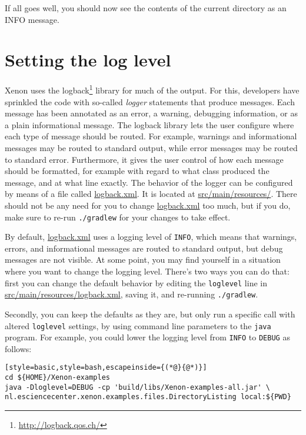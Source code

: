 If all goes well, you should now see the contents of the current directory as an INFO message.


\section{Setting the log level}
\label{sec:setting-the-log-level-command-line}

Xenon uses the logback\footnote{\url{http://logback.qos.ch/}} library for much of the output. For this, developers have sprinkled the code with so-called \textit{logger} statements that produce messages. Each message has been annotated as an error, a warning, debugging information, or as a plain informational message. The logback library lets the user configure where each type of message should be routed. For example, warnings and informational messages may be routed to standard output, while error messages may be routed to standard error. Furthermore, it gives the user control of how each message should be formatted, for example with regard to what class produced the message, and at what line exactly. The behavior of the logger can be configured by means of a file called \url{logback.xml}. It is located at \url{src/main/resources/}. There should not be any need for you to change \url{logback.xml} too much, but if you do, make sure to re-run \texttt{./gradlew} for your changes to take effect.

By default, \url{logback.xml} uses a logging level of \texttt{INFO}, which means that warnings, errors, and informational messages are routed to standard output, but debug messages are not visible. At some point, you may find yourself in a situation where you want to change the logging level. There's two ways you can do that: first you can change the default behavior by editing the \texttt{loglevel} line in \url{src/main/resources/logback.xml}, saving it, and re-running \texttt{./gradlew}.

Secondly, you can keep the defaults as they are, but only run a specific call with altered \texttt{loglevel} settings, by using command line parameters to the \texttt{java} program. For example, you could lower the logging level from \texttt{INFO} to \texttt{DEBUG} as follows:

\begin{lstlisting}[style=basic,style=bash,escapeinside={(*@}{@*)}]
cd ${HOME}/Xenon-examples
java -Dloglevel=DEBUG -cp 'build/libs/Xenon-examples-all.jar' \
nl.esciencecenter.xenon.examples.files.DirectoryListing local:${PWD}
\end{lstlisting} %

